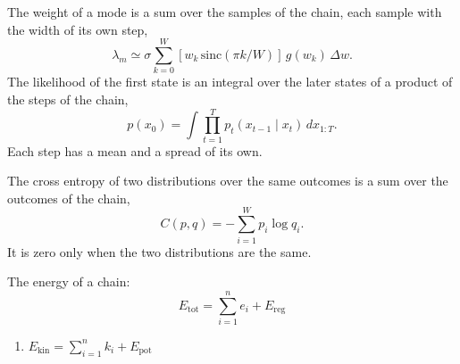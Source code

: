\documentclass[10pt,twocolumn]{article}
\begin{document}
The weight of a mode is a sum over the samples of the chain, each sample with the width of
its own step,
\begin{equation}
\lambda_m \simeq \sigma \sum_{k=0}^{W} [w_k \, \mathrm{sinc}(\pi k/W)] \, g(w_k) \, \Delta w .
\end{equation}
The likelihood of the first state is an integral over the later states of a product of the
steps of the chain,
\[ p(x_0) = \int \prod_{t=1}^{T} p_t(x_{t-1} \mid x_t) \, dx_{1:T} . \]
Each step has a mean and a spread of its own.

\newpage

\vspace*{5pt}
The cross entropy of two distributions over the same outcomes is a sum over the outcomes
of the chain,
\begin{equation}
C(p, q) = - \sum_{i=1}^{W} p_i \log q_i .
\end{equation}
It is zero only when the two distributions are the same.

\clearpage

\noindent The energy of a chain:
\[ E_{\mathrm{tot}} = \sum_{i=1}^{n} e_i + E_{\mathrm{reg}} \]
\begin{enumerate}
\item $\displaystyle E_{\mathrm{kin}} = \sum_{i=1}^{n} k_i + E_{\mathrm{pot}}$
\end{enumerate}
\end{document}
